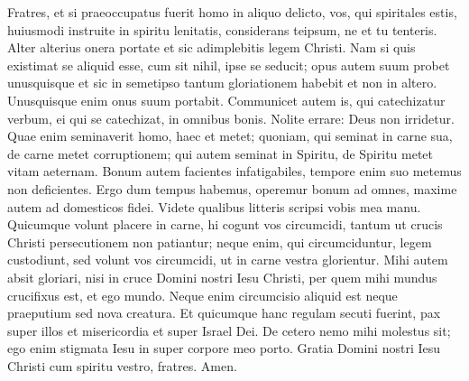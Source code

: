 \begin{biblechapter} 
\verse Fratres, et si praeoccupatus fuerit homo in aliquo delicto, vos, qui spiritales estis, huiusmodi instruite in spiritu lenitatis, considerans teipsum, ne et tu tenteris. 
\verse Alter alterius onera portate et sic adimplebitis legem Christi.  
\verse Nam si quis existimat se aliquid esse, cum sit nihil, ipse se seducit; 
\verse opus autem suum probet unusquisque et sic in semetipso tantum gloriationem habebit et non in altero. 
\verse Unusquisque enim onus suum portabit. 
\verse Communicet autem is, qui catechizatur verbum, ei qui se catechizat, in omnibus bonis. 
\verse Nolite errare: Deus non irridetur. Quae enim seminaverit homo, haec et metet; 
\verse quoniam, qui seminat in carne sua, de carne metet corruptionem; qui autem seminat in Spiritu, de Spiritu metet vitam aeternam. 
\verse Bonum autem facientes infatigabiles, tempore enim suo metemus non deficientes. 
\verse Ergo dum tempus habemus, operemur bonum ad omnes, maxime autem ad domesticos fidei. 
\verse Videte qualibus litteris scripsi vobis mea manu. 
\verse Quicumque volunt placere in carne, hi cogunt vos circumcidi, tantum ut crucis Christi persecutionem non patiantur; 
\verse neque enim, qui circumciduntur, legem custodiunt, sed volunt vos circumcidi, ut in carne vestra glorientur. 
\verse Mihi autem absit gloriari, nisi in cruce Domini nostri Iesu Christi, per quem mihi mundus crucifixus est, et ego mundo. 
\verse Neque enim circumcisio aliquid est neque praeputium sed nova creatura. 
\verse Et quicumque hanc regulam secuti fuerint, pax super illos et misericordia et super Israel Dei. 
\verse De cetero nemo mihi molestus sit; ego enim stigmata Iesu in super corpore meo porto. 
\verse Gratia Domini nostri Iesu Christi cum spiritu vestro, fratres. Amen.
\end{biblechapter}
